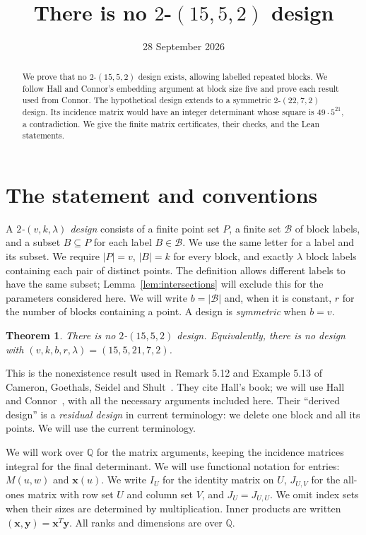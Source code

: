 \documentclass[11pt]{article}
\title{There is no $2$-$(15,5,2)$ design}
\author{}
\date{28 September 2026}
\newcommand\cB{{\mathcal B}}
\newcommand\rats{{\mathbb Q}}
\newcommand\Zy{{\mathbf y}}
\newcommand\Zx{{\mathbf x}}
\newcommand\sbs{\subseteq}
\newtheorem{theorem}{Theorem}[section]
\theoremstyle{definition}
\begin{document}
\maketitle
\begin{abstract}
We prove that no $2$-$(15,5,2)$ design exists, allowing labelled repeated
blocks. We follow Hall and Connor's embedding argument at block size five
and prove each result used from Connor. The hypothetical design extends
to a symmetric $2$-$(22,7,2)$ design. Its incidence matrix would have an
integer determinant whose square is $49\cdot5^{21}$, a contradiction.
We give the finite matrix certificates, their checks, and the
Lean statements.
\end{abstract}

\section{The statement and conventions}

A \emph{$2$-$(v,k,\lambda)$ design} consists of a finite point set $P$, a
finite set $\cB$ of block labels, and a subset $B\sbs P$ for each label
$B\in\cB$. We use the same letter for a label and its subset. We require
$|P|=v$, $|B|=k$ for every block, and exactly $\lambda$ block labels
containing each pair of distinct points. The definition allows different
labels to have the same subset; Lemma~\ref{lem:intersections} will exclude
this for the parameters considered here. We will write $b=|\cB|$ and, when it is constant,
$r$ for the number of blocks containing a point. A design is
\emph{symmetric} when $b=v$.

\begin{theorem}\label{thm:main}
There is no $2$-$(15,5,2)$ design. Equivalently, there is no design with
$(v,k,b,r,\lambda)=(15,5,21,7,2)$.
\end{theorem}

This is the nonexistence result used in Remark 5.12 and Example 5.13 of
Cameron, Goethals, Seidel and Shult~\cite{CGSS}. They cite Hall's book;
we will use Hall and Connor~\cite{HC}, with all the necessary arguments
included here. Their ``derived design'' is a \emph{residual design} in
current terminology: we delete one block and all its points. We will
use the current terminology.

We will work over $\rats$ for the matrix arguments, keeping the incidence
matrices integral for the final determinant. We will use functional
notation for entries: $M(u,w)$ and $\Zx(u)$. We write $I_U$ for the
identity matrix on $U$, $J_{U,V}$ for the all-ones matrix with row set $U$
and column set $V$, and $J_U=J_{U,U}$. We omit index sets when their sizes
are determined by multiplication. Inner products are written
$(\Zx,\Zy)=\Zx^T\Zy$. All ranks and dimensions are over $\rats$.
\end{document}
